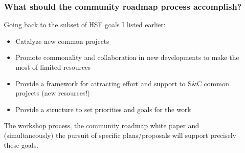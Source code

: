 \begin{frame}
 \frametitle{What should the community roadmap process accomplish?}
Going back to the subset of HSF goals I listed earlier:

\begin{itemize}
\item Catalyze new common projects
\item Promote commonality and collaboration in new developments to make the most of limited resources
\item Provide a framework for attracting effort and support to S\&C common projects (new resources!)
\item Provide a structure to set priorities and goals for the work
\end{itemize}

The workshop process, the community roadmap white paper and (simultaneously) the pursuit of specific plans/proposals will support precisely these goals.

\end{frame}


